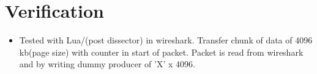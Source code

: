 \chapter{Verification} \label{chp:verification}
\begin{itemize}
	\item Tested with Lua/(post dissector) in wireshark. Transfer chunk of data of 4096 kb(page size) with counter in start of packet. Packet is read from wireshark and by writing dummy producer of 'X' x 4096.
\end{itemize}
